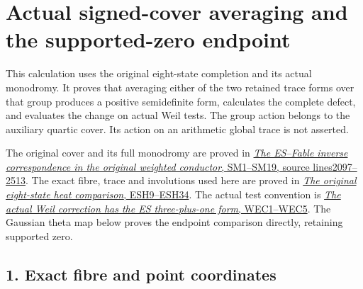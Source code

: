 \documentclass[
  10pt,
  a4paper,
]{article}
\author{}
\date{}
\begin{document}
{
\setcounter{tocdepth}{3}
\tableofcontents
}
\section{Actual signed-cover averaging and the supported-zero
endpoint}\label{actual-signed-cover-averaging-and-the-supported-zero-endpoint}

This calculation uses the original eight-state completion and its actual
monodromy. It proves that averaging either of the two retained trace
forms over that group produces a positive semidefinite form, calculates
the complete defect, and evaluates the change on actual Weil tests. The
group action belongs to the auxiliary quartic cover. Its action on an
arithmetic global trace is not asserted.

The original cover and its full monodromy are proved in
\href{https://github.com/KokunoYumeto/zeta-function-research-reader/blob/ab45e221579a0d48ce2885b4ecdf1a6aefc24a20/workbenches/splitzero-tandem/continuations/20260920-fable-boundary-action/FABLE_TO_ORIGINAL_CONDUCTOR.tex\#L2097}{\emph{The
ES--Fable inverse correspondence in the original weighted conductor},
SM1--SM19, source lines2097--2513}. The exact fibre, trace and
involutions used here are proved in
\href{https://github.com/KokunoYumeto/zeta-function-research-reader/blob/d5c9d198a8432e3ede468b280162a99c00e3f4f7/workbenches/splitzero-tandem/branches/tau-zero-prime-positivity/EIGHT_STATE_HEAT_COMPARISON.md}{\emph{The
original eight-state heat comparison}, ESH9--ESH34}. The actual test
convention is
\href{https://github.com/KokunoYumeto/zeta-function-research-reader/blob/d5c9d198a8432e3ede468b280162a99c00e3f4f7/workbenches/splitzero-tandem/branches/tau-zero-prime-positivity/WEIL_ES_COMPENSATION_DERIVATION.md}{\emph{The
actual Weil correction has the ES three-plus-one form}, WEC1--WEC5}. The
Gaussian theta map below proves the endpoint comparison directly,
retaining supported zero.

\subsection{1. Exact fibre and point
coordinates}\label{exact-fibre-and-point-coordinates}
\end{document}
